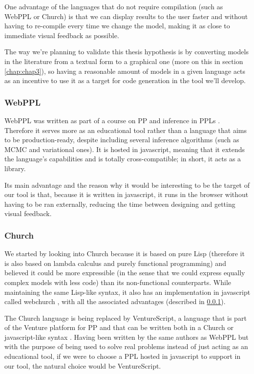 One advantage of the languages that do not require compilation
(such as WebPPL or Church) is that we can display results to the user faster and
without having to re-compile every time we change
the model, making it as close to immediate visual feedback as possible.

The way we're planning to validate this thesis hypothesis is by converting
models in the literature from a textual form to a graphical one (more on this in
section \ref{chap:chap3}), so having
a reasonable amount of models in a given language acts as an incentive to use
it as a target for code generation in the tool we'll develop.

\subsubsection{WebPPL}
\label{sec:webppl}

WebPPL was written as part of a course on PP and inference in PPLs \cite{dippl}.
Therefore it serves more as an educational tool rather than a language that aims
to be production-ready, despite including several inference algorithms (such as
MCMC and variational ones). It is hosted in javascript, meaning that it extends
the language's capabilities and is totally cross-compatible; in short, it acts
as a library.

Its main advantage and the reason why it would be interesting
to be the target of our tool is that, because it is written in javascript, it runs
in the browser without having to be ran externally, reducing the time between
designing and getting visual feedback.

\subsubsection{Church}
\label{sec:church}

We started by looking into Church because it is based on pure Lisp (therefore
it is also based on lambda calculus and purely functional programming) \cite{Goodman2008} and believed it could
be more expressible (in the sense that we could express equally complex models
with less code) than its non-functional counterparts. While maintaining the same Lisp-like syntax,
it also has an implementation in javascript called webchurch \cite{church},
with all the associated advantages (described in \ref{sec:webppl}).

The Church language is being replaced by VentureScript, a language that is part
of the Venture platform for PP and that can be written both in a Church or javascript-like
syntax \cite{probcomp}. Having been written by the same authors as WebPPL but
with the purpose of being used to solve real problems instead of just acting as
an educational tool, if we were to choose a PPL hosted in javascript to support
in our tool, the natural choice would be VentureScript.

